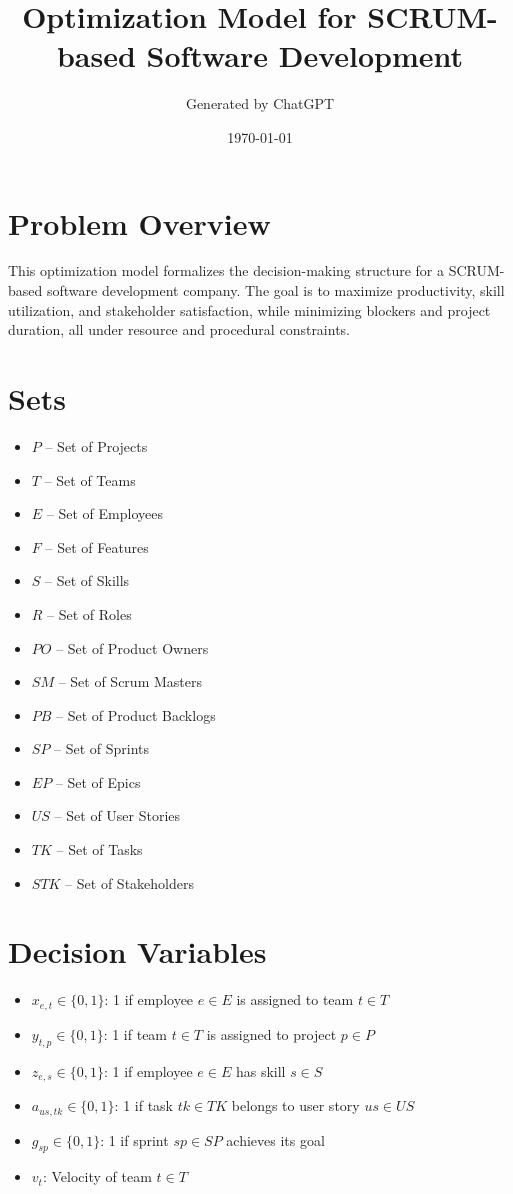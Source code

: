 \documentclass{article}
\title{Optimization Model for SCRUM-based Software Development}
\author{Generated by ChatGPT}
\date{\today}
\begin{document}
\maketitle

\section*{Problem Overview}
This optimization model formalizes the decision-making structure for a SCRUM-based software development company. The goal is to maximize productivity, skill utilization, and stakeholder satisfaction, while minimizing blockers and project duration, all under resource and procedural constraints.

\section*{Sets}
\begin{itemize}
    \item $P$ -- Set of Projects
    \item $T$ -- Set of Teams
    \item $E$ -- Set of Employees
    \item $F$ -- Set of Features
    \item $S$ -- Set of Skills
    \item $R$ -- Set of Roles
    \item $PO$ -- Set of Product Owners
    \item $SM$ -- Set of Scrum Masters
    \item $PB$ -- Set of Product Backlogs
    \item $SP$ -- Set of Sprints
    \item $EP$ -- Set of Epics
    \item $US$ -- Set of User Stories
    \item $TK$ -- Set of Tasks
    \item $STK$ -- Set of Stakeholders
\end{itemize}

\section*{Decision Variables}
\begin{itemize}
    \item $x_{e,t} \in \{0,1\}$: 1 if employee $e \in E$ is assigned to team $t \in T$
    \item $y_{t,p} \in \{0,1\}$: 1 if team $t \in T$ is assigned to project $p \in P$
    \item $z_{e,s} \in \{0,1\}$: 1 if employee $e \in E$ has skill $s \in S$
    \item $a_{us,tk} \in \{0,1\}$: 1 if task $tk \in TK$ belongs to user story $us \in US$
    \item $g_{sp} \in \{0,1\}$: 1 if sprint $sp \in SP$ achieves its goal
    \item $v_{t}$: Velocity of team $t \in T$
\end{itemize}
\end{document}
